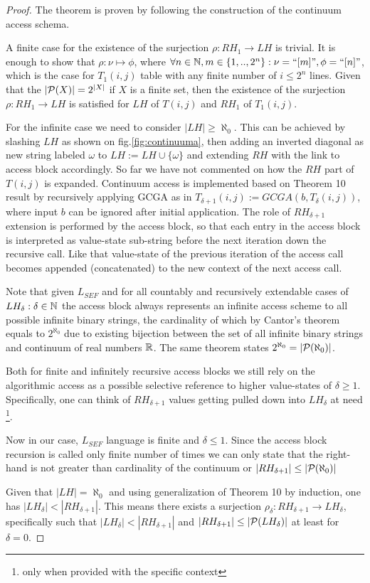 \begin{proof}The theorem is proven by following the construction of the continuum access schema.

  A finite case for the existence of the surjection $\rho \colon RH_1 \to LH$ is trivial. It is enough to show that $\rho: \nu \mapsto \phi$, where $\forall n \in \mathbb{N}, m \in \{1, .., 2^n\}: \nu = \text{``}[m]\text{''}, \phi = \text{``}[n]\text{''}$, which is the case for $T_1(i,j)$ table with any finite number of $i \leq 2^n$ lines. Given that the $|\mathcal{P}(X)| = 2^{|X|}$ if $X$ is a finite set, then the existence of the surjection $\rho \colon RH_1 \to LH$ is satisfied for $LH$ of $T(i,j)$ and $RH_1$ of $T_1(i,j)$.

  For the infinite case we need to consider $|LH| \geq \aleph_0$. This can be achieved by slashing $LH$ as shown on fig.\ref{fig:continuuma}, then adding an inverted diagonal as new string labeled $\omega$ to $LH := LH \cup \{\omega\} $ and extending $RH$ with the link to access block accordingly. So far we have not commented on how the $RH$ part of $T(i,j)$ is expanded. Continuum access is implemented based on Theorem 10 result by recursively applying GCGA as in $T_{\delta+1}(i,j) := GCGA(b, T_\delta(i,j))$, where input $b$ can be ignored after initial application. The role of $RH_{\delta+1}$ extension is performed by the access block, so that each entry in the access block is interpreted as value-state sub-string before the next iteration down the recursive call. Like that value-state of the previous iteration of the access call becomes appended (concatenated) to the new context of the next access call.

  Note that given $L_{SEF}$ and for all countably and recursively extendable cases of $LH_\delta: \delta \in \mathbb{N}$ the access block always represents an infinite access scheme to all possible infinite binary strings, the cardinality of which by Cantor's theorem equals to $2^{\aleph_0}$ due to existing bijection between the set of all infinite binary strings and continuum of real numbers $\mathbb{R}$. The same theorem states $2^{\aleph_0} = |\mathcal{P}(\aleph_0)|$\cite{jech2003set}.

  Both for finite and infinitely recursive access blocks we still rely on the algorithmic access as a possible selective reference to higher value-states of $\delta \geq 1$. Specifically, one can think of $RH_{\delta+1}$ values getting pulled down into $LH_{\delta}$ at need \footnote{only when provided with the specific context}.

  Now in our case, $L_{SEF}$ language is finite and $\delta \leq 1$. Since the access block recursion is called only finite number of times we can only state that the right-hand is not greater than cardinality of the continuum or $|RH_{\delta+1}| \leq |\mathcal{P}(\aleph_0)|$

  Given that $|LH| = \aleph_0$ and using generalization of Theorem 10 by induction, one has $|LH_{\delta}| < |RH_{\delta+1}|$. This means there exists a surjection  $\rho_\delta \colon RH_{\delta+1} \to LH_\delta$, specifically such that $|LH_\delta| < |RH_{\delta+1}|$ and $|RH_{\delta+1}| \leq |\mathcal{P}(LH_\delta)|$ at least for $\delta = 0$.\end{proof}

